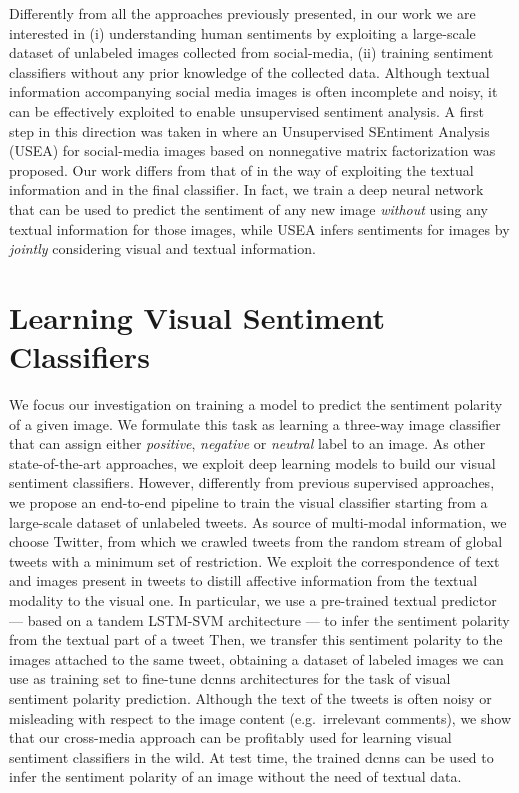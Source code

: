 Differently from all the approaches previously presented, in our work we are interested in (i) understanding human sentiments by exploiting a large-scale dataset of unlabeled images collected from social-media, (ii) training sentiment classifiers without any prior knowledge of the collected data.
Although textual information accompanying social media images is often incomplete and noisy, it can be effectively exploited to enable unsupervised sentiment analysis.
A first step in this direction was taken in \cite{wang2015unsupervised} where an Unsupervised SEntiment Analysis (USEA) for social-media images based on nonnegative matrix factorization was proposed.
Our work differs from that of \citet{wang2015unsupervised} in the way of exploiting the textual information and in the final classifier.
In fact, we train a deep neural network that can be used to predict the sentiment of any new image \emph{without} using any textual information for those images, while USEA infers sentiments for images by \emph{jointly} considering visual and textual information.


\section{Learning Visual Sentiment Classifiers}

We focus our investigation on training a model to predict the sentiment polarity of a given image.
We formulate this task as learning a three-way image classifier that can assign either \emph{positive}, \emph{negative} or \emph{neutral} label to an image.
As other state-of-the-art approaches, we exploit deep learning models to build our visual sentiment classifiers.
However, differently from previous supervised approaches, we propose an end-to-end pipeline to train the visual classifier starting from a large-scale dataset of unlabeled tweets.
As source of multi-modal information, we choose Twitter, from which we crawled tweets from the random stream of global tweets with a minimum set of restriction.
We exploit the correspondence of text and images present in tweets to distill affective information from the textual modality to the visual one.
In particular, we use a pre-trained textual predictor --- based on a tandem \gls{LSTM}-\gls{SVM} architecture --- to infer the sentiment polarity from the textual part of a tweet
Then, we transfer this sentiment polarity to the images attached to the same tweet, obtaining a dataset of labeled images we can use as training set to fine-tune \glspl{dcnn} architectures for the task of visual sentiment polarity prediction.
Although the text of the tweets is often noisy or misleading with respect to the image content (e.g.\ irrelevant comments), we show that our cross-media approach can be profitably used for learning visual sentiment classifiers in the wild.
At test time, the trained \glspl{dcnn} can be used to infer the sentiment polarity of an image without the need of textual data.

